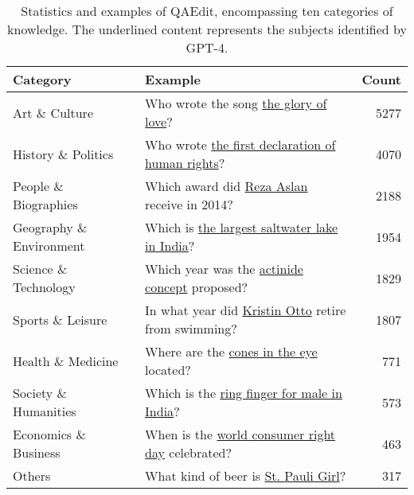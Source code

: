 \begin{table}[t]
\centering
\begin{adjustbox}{max width=\linewidth} 
\begin{tabular}{llr}
\toprule
 Category  & Example  & Count \\
\midrule
Art \& Culture & Who wrote the song \underline{the glory of love}? & 5277 \\
History \& Politics & Who wrote \underline{the first declaration of human rights}? & 4070 \\
People \& Biographies & Which award did \underline{Reza Aslan} receive in 2014? & 2188 \\
Geography \& Environment & Which is \underline{the largest saltwater lake in India}? & 1954 \\
Science \& Technology & Which year was the \underline{actinide concept} proposed? & 1829 \\
Sports \& Leisure & In what year did \underline{Kristin Otto} retire from swimming? & 1807 \\
Health \& Medicine & Where are the \underline{cones in the eye} located? & 771 \\
Society \& Humanities & Which is the \underline{ring finger for male in India}? & 573 \\
Economics \& Business & When is the \underline{world consumer right day} celebrated? & 463 \\
Others & What kind of beer is \underline{St. Pauli Girl}? & 317 \\
\bottomrule 
\end{tabular}
\end{adjustbox}
\caption{Statistics and examples of QAEdit, encompassing ten categories of knowledge.
The underlined content represents the subjects identified by GPT-4.}
\label{tab:QAEdit_Stat}
\end{table}
